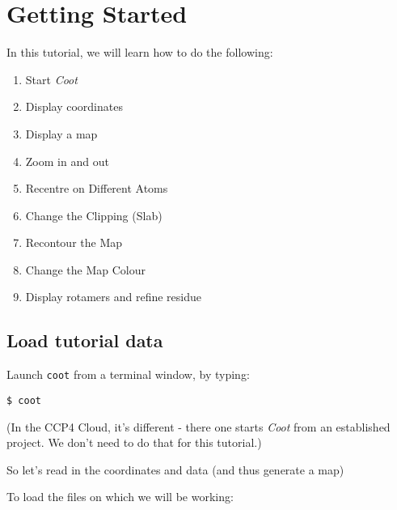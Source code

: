 \documentclass{article}
\begin{document}
\section{Getting Started}

In this tutorial, we will learn how to do the following:
\begin{enumerate}
\item Start \emph{Coot}
\item Display coordinates
\item Display a map
\item Zoom in and out
\item Recentre on Different Atoms
\item Change the Clipping (Slab)
\item Recontour the Map
\item Change the Map Colour
\item Display rotamers and refine residue
\end{enumerate}

\subsection{Load tutorial data}

Launch \texttt{coot} from a terminal window, by typing:

\texttt{\$ coot}

(In the CCP4 Cloud, it's different - there one starts \emph{Coot}
from an established project. We don't need to do that for this tutorial.)



So let's read in the coordinates and data (and thus generate a map)

To load the files on which we will be working:
\end{document}
